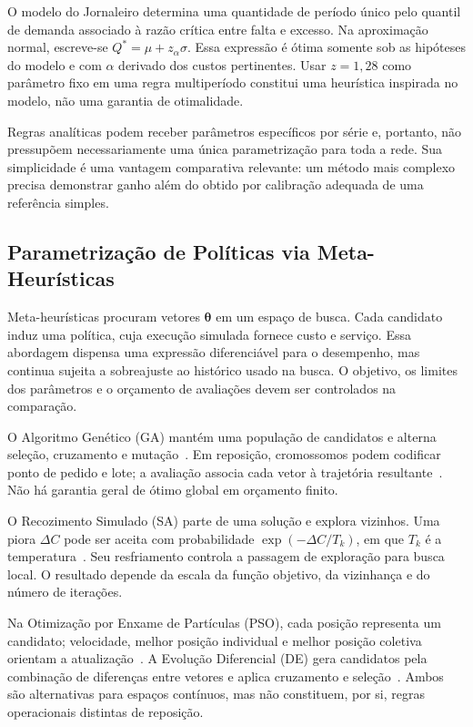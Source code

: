 O modelo do Jornaleiro determina uma quantidade de período único pelo quantil de demanda associado à razão crítica entre falta e excesso. Na aproximação normal, escreve-se $Q^*=\mu+z_\alpha\sigma$. Essa expressão é ótima somente sob as hipóteses do modelo e com $\alpha$ derivado dos custos pertinentes. Usar $z=1{,}28$ como parâmetro fixo em uma regra multiperíodo constitui uma heurística inspirada no modelo, não uma garantia de otimalidade.

Regras analíticas podem receber parâmetros específicos por série e, portanto, não pressupõem necessariamente uma única parametrização para toda a rede. Sua simplicidade é uma vantagem comparativa relevante: um método mais complexo precisa demonstrar ganho além do obtido por calibração adequada de uma referência simples.

\subsection{Parametrização de Políticas via Meta-Heurísticas}

Meta-heurísticas procuram vetores $\boldsymbol\theta$ em um espaço de busca. Cada candidato induz uma política, cuja execução simulada fornece custo e serviço. Essa abordagem dispensa uma expressão diferenciável para o desempenho, mas continua sujeita a sobreajuste ao histórico usado na busca. O objetivo, os limites dos parâmetros e o orçamento de avaliações devem ser controlados na comparação.

O Algoritmo Genético (GA) mantém uma população de candidatos e alterna seleção, cruzamento e mutação~\citep{Holland1992ANAS,Talbi2009Metaheuristics}. Em reposição, cromossomos podem codificar ponto de pedido e lote; a avaliação associa cada vetor à trajetória resultante~\citep{Yuna2023IntermittentMetaheuristics}. Não há garantia geral de ótimo global em orçamento finito.

O Recozimento Simulado (SA) parte de uma solução e explora vizinhos. Uma piora $\Delta C$ pode ser aceita com probabilidade $\exp(-\Delta C/T_k)$, em que $T_k$ é a temperatura~\citep{Kirkpatrick1983SA}. Seu resfriamento controla a passagem de exploração para busca local. O resultado depende da escala da função objetivo, da vizinhança e do número de iterações.

Na Otimização por Enxame de Partículas (PSO), cada posição representa um candidato; velocidade, melhor posição individual e melhor posição coletiva orientam a atualização~\citep{Kennedy1995PSO}. A Evolução Diferencial (DE) gera candidatos pela combinação de diferenças entre vetores e aplica cruzamento e seleção~\citep{Storn1997DE}. Ambos são alternativas para espaços contínuos, mas não constituem, por si, regras operacionais distintas de reposição.

